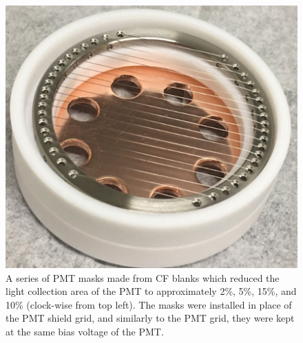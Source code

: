 \begin{figure}[htbp]
\begin{center}
\includegraphics[width=\halffig]{figures/etrains/mask4.png}
\caption{A series of \acs{PMT} masks made from \acs{CF} blanks which reduced the light collection area of the \acs{PMT} to approximately 2\%, 5\%, 15\%, and 10\% (clock-wise from top left). The masks were installed in place of the \acs{PMT} shield grid, and similarly to the \acs{PMT} grid, they were kept at the same bias voltage of the \acs{PMT}. }
\label{fig:pmt_masks}
\end{center}
\end{figure}

